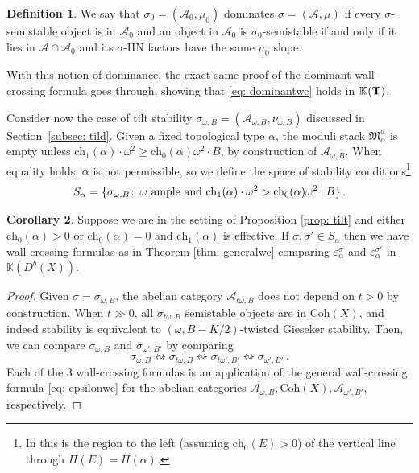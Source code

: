 \documentclass[12pt]{amsart}
\theoremstyle{definition}
\newtheorem{definition}{Definition}[section]
\newtheorem{corollary}[definition]{Corollary}
\newcommand{\BK}{{\mathbb{K}}}
\newcommand{\CA}{{\mathcal A}}
\newcommand{\1}{\mathbf 1}
\newcommand{\bfT}{{\bf T}}
\newcommand{\FM}{{\mathfrak{M}}}
\newcommand{\ch}{\mathrm{ch}}
\newcommand{\Coh}{\mathrm{Coh}}
\begin{document}
\begin{definition}\label{def: dominationheart}
    We say that $\sigma_0=(\CA_0, \mu_0)$ dominates $\sigma=(\CA, \mu)$ if every $\sigma$-semistable object is in $\CA_0$ and an object in $\CA_0$ is $\sigma_0$-semistable if and only if it lies in $\CA\cap \CA_0$ and its $\sigma$-HN factors have the same $\mu_0$ slope. 
\end{definition}

With this notion of dominance, the exact same proof of the dominant wall-crossing formula goes through, showing that \eqref{eq: dominantwc} holds in $\BK(\bfT)$. 

Consider now the case of tilt stability $\sigma_{\omega, B}=(\CA_{\omega, B}, \nu_{\omega, B})$ discussed in Section~\ref{subsec: tild}. Given a fixed topological type $\alpha$, the moduli stack $\FM^{\sigma}_\alpha$ is empty unless $\ch_1 (\alpha)\cdot \omega^2\geq \ch_0(\alpha) \omega^2\cdot B$, by construction of $\CA_{\omega, B}$. When equality holds, $\alpha$ is not permissible, so we define the space of stability conditions\footnote{In \cite[Figure 1]{FTr0} this is the region to the left (assuming $\ch_0(E)>0$) of the vertical line through $\Pi(E)=\Pi(\alpha)$.}
\[S_\alpha=\{\sigma_{\omega, B}\colon\, \omega \textup{ ample and }\ch_1 (\alpha)\cdot \omega^2> \ch_0(\alpha) \omega^2\cdot B\}\,.\]

\begin{corollary}
    Suppose we are in the setting of Proposition \ref{prop: tilt} and either $\ch_0(\alpha)>0$ or $\ch_0(\alpha)=0$ and $\ch_1(\alpha)$ is effective. If $\sigma, \sigma'\in S_\alpha$ then we have wall-crossing formulas as in Theorem \ref{thm: generalwc} comparing $\varepsilon_\alpha^\sigma$ and $\varepsilon_\alpha^{\sigma'}$ in $\BK(D^b(X))$.
\end{corollary}
\begin{proof}
    Given $\sigma=\sigma_{\omega, B}$, the abelian category $\CA_{t\omega, B}$ does not depend on $t>0$ by construction. When $t\gg 0$, all $\sigma_{t\omega, B}$ semistable objects are in $\Coh(X)$, and indeed stability is equivalent to $(\omega, B-K/2)$-twisted Gieseker stability. Then, we can compare $\sigma_{\omega, B}$ and $\sigma_{\omega', B'}$ by comparing 
    \[\sigma_{\omega, B}\leftrightsquigarrow \sigma_{t\omega, B} \leftrightsquigarrow \sigma_{t\omega', B'}\leftrightsquigarrow \sigma_{\omega', B'}\,.\]
    Each of the 3 wall-crossing formulas is an application of the general wall-crossing formula \eqref{eq: epsilonwc} for the abelian categories $\CA_{\omega, B}, \Coh(X), \CA_{\omega', B'}$, respectively.\qedhere
\end{proof}
\end{document}
